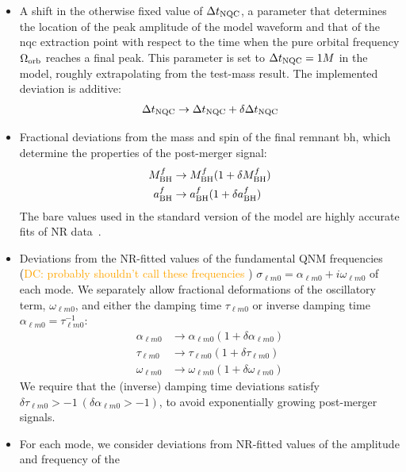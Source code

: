 \documentclass[prd,amssymb,amsmath,amsfonts,nofootinbib,reprint,showpacs,longbibliography]{revtex4-1}
\def\mbhf{M_{\rm BH}^f}
\def\abhf{a_{\rm BH}^f}
\def\alphalm0{\alpha_{\ell m 0}}
\def\taulm0{\tau_{\ell m 0}}
\def\omegalm0{\omega_{\ell m 0}}
\newcommand{\DC}[1]{{\textcolor{orange}{{DC: #1}} }}
\begin{document}
\begin{itemize}
    \item A shift in the otherwise fixed value of $\Delta t_{\rm NQC}$, a parameter that determines the location
    of the peak amplitude of the model waveform and that of the \ac{nqc} extraction point with respect to the
    time when the pure orbital frequency $\Omega_{\rm orb}$ reaches a final peak. This parameter is set
    to $\Delta t_{\rm NQC} = 1M$ in the model, roughly extrapolating from the test-mass result. The implemented
    deviation is additive:
    \begin{equation}
    \Delta t_{\rm NQC} \rightarrow \Delta t_{\rm NQC} + \delta \Delta t_{\rm NQC}
    \end{equation}
    \item Fractional deviations from the mass and spin of the final remnant \ac{bh}, which determine the properties
    of the post-merger signal:
    \begin{subequations}
    \begin{align}
    \mbhf &\rightarrow \mbhf (1 + \delta \mbhf) \\
    \abhf &\rightarrow \abhf (1 + \delta \abhf)
    \end{align}
    \end{subequations}
    The bare values used in the standard version of the model are highly accurate fits of NR data~\cite{paper}.
%
\item Deviations from the NR-fitted values of the fundamental QNM frequencies (\DC{probably shouldn't call these frequencies})
$\sigma_{\ell m 0} = \alphalm0 + i \omegalm0$ of each mode. We separately allow fractional deformations of the oscillatory
term, $\omegalm0$, and either the damping time $\taulm0$ or inverse damping time $\alphalm0 = \taulm0^{-1}$:
\begin{subequations}
\begin{align}
\alphalm0 &\rightarrow \alphalm0 (1 + \delta \alphalm0) \\
\taulm0   &\rightarrow \taulm0   (1 + \delta \taulm0) \\
\omegalm0 &\rightarrow \omegalm0 (1 + \delta \omegalm0)
\end{align}
\end{subequations}
We require that the (inverse) damping time deviations satisfy $\delta \taulm0 > -1\  (\delta \alphalm0 > -1)$, to avoid exponentially growing
post-merger signals.
%
\item For each mode, we consider deviations from NR-fitted values of the amplitude and frequency of the

\end{itemize}
\end{document}

